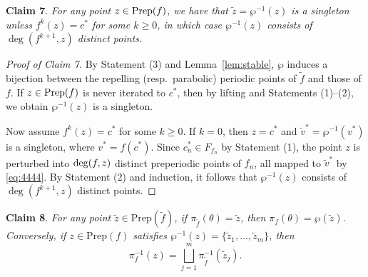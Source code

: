 \documentclass[a4paper,reqno,times, 11pt]{amsart}
\theoremstyle{remark}
\theoremstyle{plain}
\numberwithin{equation}{section}
\def\t{\tilde}
\begin{document}
{\bf Claim 7}. \emph{For any  point $z\in {\rm Prep}(f)$, we have that $\t{z}=\wp^{-1}(z)$ is a singleton unless $f^k(z)=c^*$ for some $k\geq0$, in which case $\wp^{-1}(z)$ consists of $\deg(f^{k+1}, z)$ distinct points.}
\begin{proof}[Proof of Claim 7]
By Statement (3) and Lemma~\ref{lem:stable}, $\wp$ induces a bijection between the repelling (resp.\ parabolic) periodic points of \(\tilde f\) and those of \(f\). If $z\in {\rm Prep}(f)$ is never iterated to $c^*$, then by lifting and Statements (1)--(2), we obtain $\wp^{-1}(z)$ is a singleton.

Now assume \(f^k(z)=c^*\) for some \(k\ge 0\).  
If \(k=0\), then \(z=c^*\) and \(\tilde v^*=\wp^{-1}(v^*)\) is a singleton, where \(v^*=f(c^*)\).  
Since \(c_n^*\in F_{f_n}\) by Statement (1), the point \(z\) is perturbed into \({\rm deg}(f,z)\) distinct preperiodic points of \(f_n\), all mapped to \(\tilde v^*\) by \eqref{eq:4444}.  
By Statement (2) and induction, it follows that \(\wp^{-1}(z)\) consists of \(\deg(f^{k+1}, z)\) distinct points.
\end{proof}

{\bf Claim 8}. \emph{For any point \(\tilde z\in \mathrm{Prep}(\tilde f)\), if \(\pi_{\tilde f}(\theta)=\tilde z\), then \(\pi_f(\theta)=\wp(\tilde z)\). Conversely, if \(z\in\mathrm{Prep}(f)\) satisfies \(\wp^{-1}(z)=\{\tilde z_1,\dots,\tilde z_m\}\), then  
\[
\pi_f^{-1}(z)=\bigsqcup_{j=1}^{m}\pi_{\tilde f}^{-1}(\tilde z_j).
\]}
\end{document}
